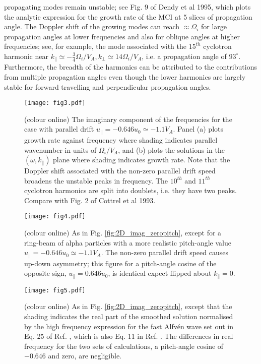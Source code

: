 \documentclass[12pt]{iopart}
\begin{document}
propagating modes remain unstable; see Fig. 9 of Dendy et al 1995, which plots
the analytic expression for the growth rate of the MCI at 5 slices of
propagation angle. The Doppler shift of the growing modes can reach $\approx
\Omega_i$ for large propagation angles at lower frequencies and also for
oblique angles at higher frequencies; see, for example, the mode
associated with the $15^{th}$ cyclotron harmonic near $k_\parallel \simeq
-\frac{3}{4} \Omega_i/V_A, k_\perp \simeq 14 \Omega_i/V_A$, i.e. a propagation
angle of $93^\circ$. Furthermore, the breadth of the harmonics can be
attributed to the contributions from multiple propagation angles even though the
lower harmonics are largely stable for forward travelling and perpendicular
propagation angles.

\begin{figure}[ht!]
    \raggedleft
\texttt{[image: fig3.pdf]}
    \caption{(colour online) The imaginary component of the frequencies for the
    case with parallel drift $u_{\parallel} = -0.646 u_0 \simeq -1.1 V_A$.
    Panel (a) plots growth rate against frequency where shading indicates
    parallel wavenumber in units of $\Omega_i/V_A$, and (b) plots the solutions
    in the $(\omega,k_\parallel)$ plane where shading indicates growth rate. Note
    that the Doppler shift associated with the non-zero parallel drift speed
    broadens the unstable peaks in frequency. The $10^{th}$ and $11^{th}$ cyclotron
    harmonics are split into doublets, i.e. they have two peaks. Compare with
    Fig. 2 of Cottrel et al 1993.}
    \label{fig:2D_F12_physicalpitch}
\end{figure}

\begin{figure}[ht!]
    \raggedleft
\texttt{[image: fig4.pdf]}
    \caption{(colour online) As in Fig. \ref{fig:2D_imag_zeropitch}, except for
    a ring-beam of alpha particles with a more realistic pitch-angle value
    $u_{\parallel} = -0.646 u_0 \simeq -1.1 V_A$. The non-zero parallel drift
    speed causes up-down asymmetry; this figure for a pitch-angle cosine of the
    opposite sign, $u_{\parallel} = 0.646 u_0$, is identical expect flipped
    about $k_\parallel=0$.}
    \label{fig:2D_imag_physicalpitch}
\end{figure}


\begin{figure}[ht!]
    \raggedleft
\texttt{[image: fig5.pdf]}
    \caption{(colour online) As in Fig. \ref{fig:2D_imag_zeropitch}, except that
    the shading indicates the real part of the smoothed solution normalised by
    the high frequency expression for the fast Alfv{\'e}n wave set out in Eq. 25
    of Ref. \cite{Dendy1994}, which is also Eq. 11 in Ref.
    \cite{McClements1996}. The differences in real frequency for the two sets of
    calculations, a pitch-angle cosine of $-0.646$ and zero, are
    negligible.}
    \label{fig:2D_real_zeropitch}
\end{figure}
\end{document}
